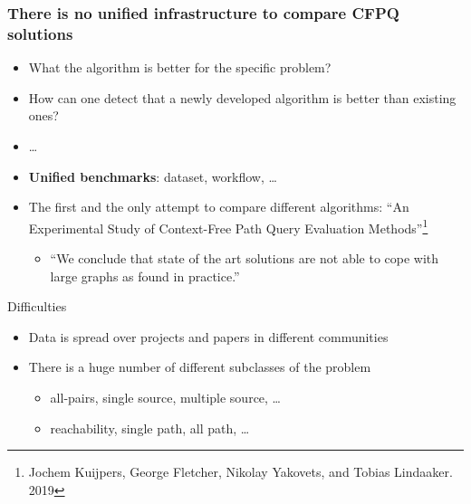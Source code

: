 \documentclass[xcolor=table,aspectratio=169]{beamer}
\begin{document}
\begin{frame}[fragile]
  \frametitle{There is no unified infrastructure to compare CFPQ solutions}  
  \begin{itemize}
    \item[\faQuestion] What the algorithm is better for the specific problem?    
    \item[\faQuestion] How can one detect that a newly developed algorithm is better than existing ones?
    \item[\faQuestion] \ldots 
    \pause 
    \item[\faLightbulb] \textbf{Unified benchmarks}: dataset, workflow, \ldots
    \pause 
    \item[\faExclamation] The first and the only attempt to compare different algorithms: ``An Experimental Study of Context-Free Path Query Evaluation Methods''\footnote{Jochem Kuijpers, George Fletcher, Nikolay Yakovets, and Tobias Lindaaker. 2019}
      \pause
      \begin{itemize}
      \item[\faFrown] ``We conclude that state of the art solutions are not able to cope with large graphs as found in practice.''
      \end{itemize}
    \end{itemize}
  \pause
  \vfill
  Difficulties
    \begin{itemize}
      \item Data is spread over projects and papers in different communities
      \item There is a huge number of different subclasses of the problem
      \begin{itemize}
        \item all-pairs, single source, multiple source, \dots 
        \item reachability, single path, all path, \dots 
      \end{itemize}
  \end{itemize}
\end{frame}
\end{document}
